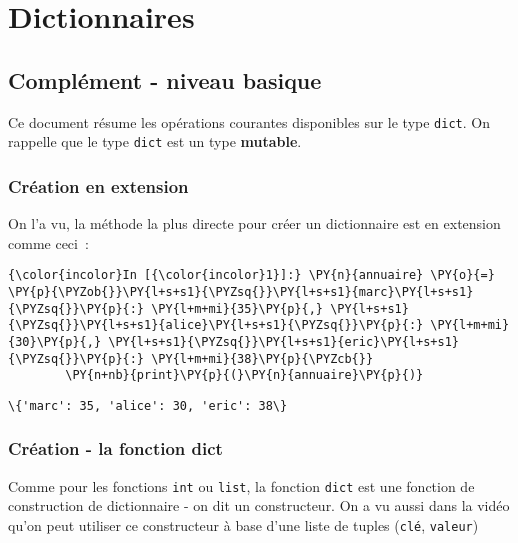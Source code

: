     \hypertarget{dictionnaires}{%
\section{Dictionnaires}\label{dictionnaires}}

    \hypertarget{compluxe9ment---niveau-basique}{%
\subsection{Complément - niveau
basique}\label{compluxe9ment---niveau-basique}}

    Ce document résume les opérations courantes disponibles sur le type
\texttt{dict}. On rappelle que le type \texttt{dict} est un type
\textbf{mutable}.

    \hypertarget{cruxe9ation-en-extension}{%
\subsubsection{Création en extension}\label{cruxe9ation-en-extension}}

    On l'a vu, la méthode la plus directe pour créer un dictionnaire est en
extension comme ceci~:

    \begin{Verbatim}[commandchars=\\\{\}]
{\color{incolor}In [{\color{incolor}1}]:} \PY{n}{annuaire} \PY{o}{=} \PY{p}{\PYZob{}}\PY{l+s+s1}{\PYZsq{}}\PY{l+s+s1}{marc}\PY{l+s+s1}{\PYZsq{}}\PY{p}{:} \PY{l+m+mi}{35}\PY{p}{,} \PY{l+s+s1}{\PYZsq{}}\PY{l+s+s1}{alice}\PY{l+s+s1}{\PYZsq{}}\PY{p}{:} \PY{l+m+mi}{30}\PY{p}{,} \PY{l+s+s1}{\PYZsq{}}\PY{l+s+s1}{eric}\PY{l+s+s1}{\PYZsq{}}\PY{p}{:} \PY{l+m+mi}{38}\PY{p}{\PYZcb{}}
        \PY{n+nb}{print}\PY{p}{(}\PY{n}{annuaire}\PY{p}{)}
\end{Verbatim}


    \begin{Verbatim}[commandchars=\\\{\}]
\{'marc': 35, 'alice': 30, 'eric': 38\}

    \end{Verbatim}

    \hypertarget{cruxe9ation---la-fonction-dict}{%
\subsubsection{Création - la fonction
dict}\label{cruxe9ation---la-fonction-dict}}

    Comme pour les fonctions \texttt{int} ou \texttt{list}, la fonction
\texttt{dict} est une fonction de construction de dictionnaire - on dit
un constructeur. On a vu aussi dans la vidéo qu'on peut utiliser ce
constructeur à base d'une liste de tuples (\texttt{clé},
\texttt{valeur})

